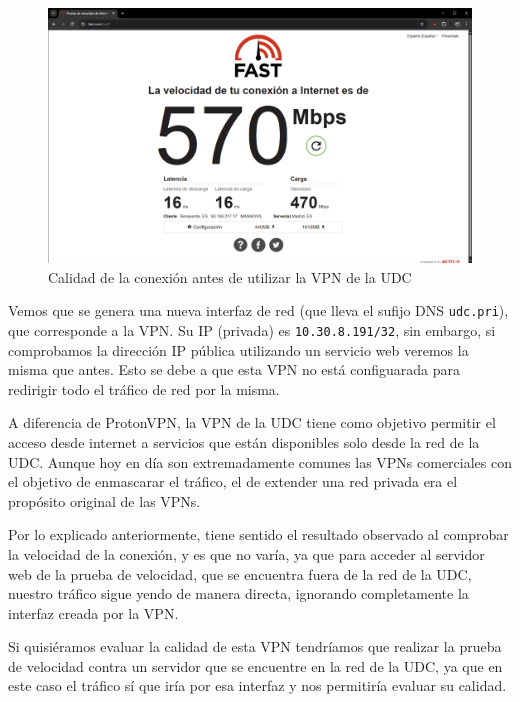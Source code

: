 \begin{figure}[H]
    \centering
    \includegraphics[width=\linewidth]{CalidadConexion-VPN-UDC.png}
    \caption{Calidad de la conexión antes de utilizar la VPN de la UDC}
    \label{fig:Calidad-Conexión-VPN-UDC}
\end{figure}

Vemos que se genera una nueva interfaz de red (que lleva el sufijo DNS \texttt{udc.pri}), que corresponde a la VPN. Su IP (privada) es \texttt{10.30.8.191/32}, sin embargo, si comprobamos la dirección IP pública utilizando un servicio web veremos la misma que antes. Esto se debe a que esta VPN no está configuarada para redirigir todo el tráfico de red por la misma.

A diferencia de ProtonVPN, la VPN de la UDC tiene como objetivo permitir el acceso desde internet a servicios que están disponibles solo desde la red de la UDC. Aunque hoy en día son extremadamente comunes las VPNs comerciales con el objetivo de enmascarar el tráfico, el de extender una red privada era el propósito original de las VPNs.

Por lo explicado anteriormente, tiene sentido el resultado observado al comprobar la velocidad de la conexión, y es que no varía, ya que para acceder al servidor web de la prueba de velocidad, que se encuentra fuera de la red de la UDC, nuestro tráfico sigue yendo de manera directa, ignorando completamente la interfaz creada por la VPN.

Si quisiéramos evaluar la calidad de esta VPN tendríamos que realizar la prueba de velocidad contra un servidor que se encuentre en la red de la UDC, ya que en este caso el tráfico sí que iría por esa interfaz y nos permitiría evaluar su calidad.

